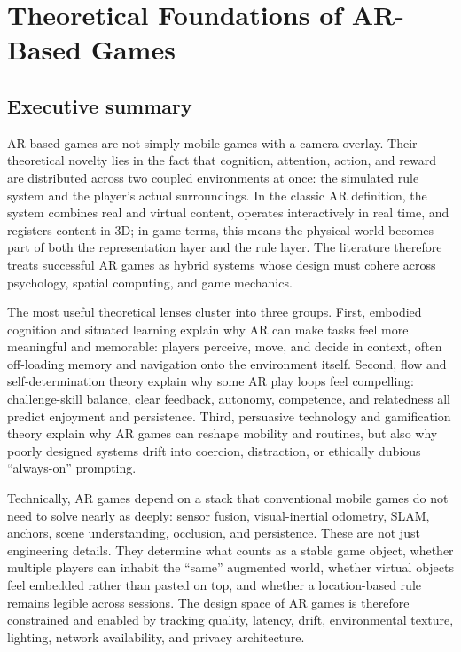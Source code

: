 \chapter*{Theoretical Foundations of AR-Based Games}
\begin{sloppy}

\section*{Executive summary}
AR-based games are not simply mobile games with a camera overlay. Their theoretical novelty lies in the fact that cognition, attention, action, and reward are distributed across two coupled environments at once: the simulated rule system and the player's actual surroundings. In the classic AR definition, the system combines real and virtual content, operates interactively in real time, and registers content in 3D; in game terms, this means the physical world becomes part of both the representation layer and the rule layer. The literature therefore treats successful AR games as hybrid systems whose design must cohere across psychology, spatial computing, and game mechanics.

The most useful theoretical lenses cluster into three groups. First, embodied cognition and situated learning explain why AR can make tasks feel more meaningful and memorable: players perceive, move, and decide in context, often off-loading memory and navigation onto the environment itself. Second, flow and self-determination theory explain why some AR play loops feel compelling: challenge-skill balance, clear feedback, autonomy, competence, and relatedness all predict enjoyment and persistence. Third, persuasive technology and gamification theory explain why AR games can reshape mobility and routines, but also why poorly designed systems drift into coercion, distraction, or ethically dubious ``always-on'' prompting.

Technically, AR games depend on a stack that conventional mobile games do not need to solve nearly as deeply: sensor fusion, visual-inertial odometry, SLAM, anchors, scene understanding, occlusion, and persistence. These are not just engineering details. They determine what counts as a stable game object, whether multiple players can inhabit the ``same'' augmented world, whether virtual objects feel embedded rather than pasted on top, and whether a location-based rule remains legible across sessions. The design space of AR games is therefore constrained and enabled by tracking quality, latency, drift, environmental texture, lighting, network availability, and privacy architecture.


\end{sloppy}
